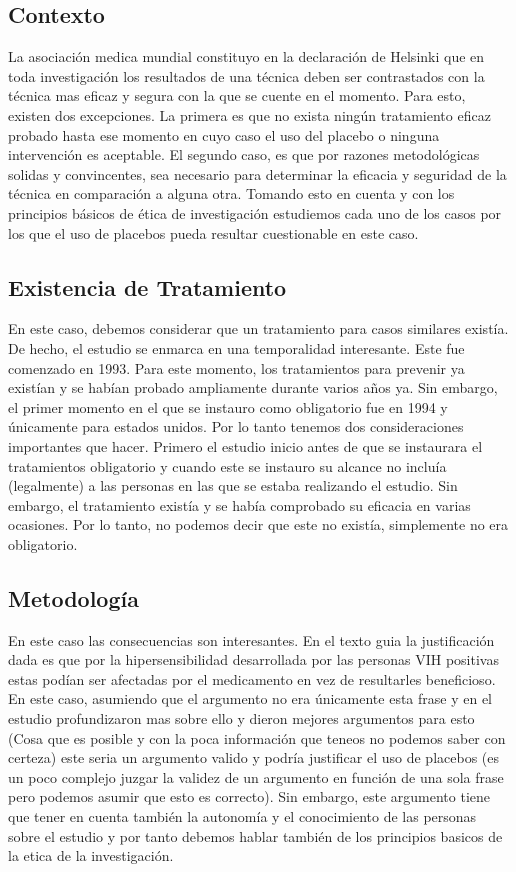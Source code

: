 \subsection*{Contexto}

La asociación medica mundial constituyo en la declaración de Helsinki que en toda investigación los resultados de una técnica deben ser contrastados con la técnica mas eficaz y segura con la que se cuente en el momento. Para esto, existen dos excepciones. La primera es que no exista ningún tratamiento eficaz probado hasta ese momento en cuyo caso el uso del placebo o ninguna intervención es aceptable. El segundo caso, es que por razones metodológicas solidas y convincentes, sea necesario para determinar la eficacia y seguridad de la técnica en comparación a alguna otra. Tomando esto en cuenta y con los principios básicos de ética de investigación estudiemos cada uno de los casos por los que el uso de placebos pueda resultar cuestionable en este caso.

\subsection*{Existencia de Tratamiento}

En este caso, debemos considerar que un tratamiento para casos similares existía. De hecho, el estudio se enmarca en una temporalidad interesante. Este fue comenzado en 1993. Para este momento, los tratamientos para prevenir ya existían y se habían probado ampliamente durante varios años ya. Sin embargo, el primer momento en el que se instauro como obligatorio fue en 1994 y únicamente para estados unidos. Por lo tanto tenemos dos consideraciones importantes que hacer. Primero el estudio inicio antes de que se instaurara el tratamientos obligatorio y cuando este se instauro su alcance no incluía (legalmente) a las personas en las que se estaba realizando el estudio. Sin embargo, el tratamiento existía y se había comprobado su eficacia en varias ocasiones. Por lo tanto, no podemos decir que este no existía, simplemente no era obligatorio.

\subsection*{Metodología}

En este caso las consecuencias son interesantes. En el texto guia la justificación dada es que por la hipersensibilidad desarrollada por las personas VIH positivas estas podían ser afectadas por el medicamento en vez de resultarles beneficioso. En este caso, asumiendo que el argumento no era únicamente esta frase y en el estudio profundizaron mas sobre ello y dieron mejores argumentos para esto (Cosa que es posible y con la poca información que teneos no podemos saber con certeza) este seria un argumento valido y podría justificar el uso de placebos (es un poco complejo juzgar la validez de un argumento en función de una sola frase pero podemos asumir que esto es correcto). Sin embargo, este argumento tiene que tener en cuenta también la autonomía y el conocimiento de las personas sobre el estudio y por tanto debemos hablar también de los principios basicos de la etica de la investigación.

